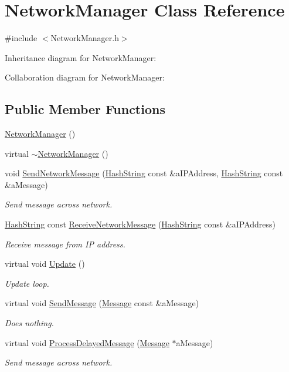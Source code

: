 \hypertarget{classNetworkManager}{}\section{Network\+Manager Class Reference}
\label{classNetworkManager}


{\ttfamily \#include $<$Network\+Manager.\+h$>$}



Inheritance diagram for Network\+Manager\+:


Collaboration diagram for Network\+Manager\+:
\subsection*{Public Member Functions}
\begin{DoxyCompactItemize}
\item 
\hyperlink{classNetworkManager_a5aaf71c4aa7a2efab7f1dbae02312280}{Network\+Manager} ()
\item 
virtual \hyperlink{classNetworkManager_a2cfe4223139cf58587a9f066b956cb23}{$\sim$\+Network\+Manager} ()
\item 
void \hyperlink{classNetworkManager_a025ee7c6f48d637ad8f7da5cc1214747}{Send\+Network\+Message} (\hyperlink{classHashString}{Hash\+String} const \&a\+I\+P\+Address, \hyperlink{classHashString}{Hash\+String} const \&a\+Message)
\begin{DoxyCompactList}\small\item\em Send message across network. \end{DoxyCompactList}\item 
\hyperlink{classHashString}{Hash\+String} const \hyperlink{classNetworkManager_ab30223e649c6c704eac910c3880d3931}{Receive\+Network\+Message} (\hyperlink{classHashString}{Hash\+String} const \&a\+I\+P\+Address)
\begin{DoxyCompactList}\small\item\em Receive message from IP address. \end{DoxyCompactList}\item 
virtual void \hyperlink{classNetworkManager_ad71efb4104426ea7201edaff52ba9a00}{Update} ()
\begin{DoxyCompactList}\small\item\em Update loop. \end{DoxyCompactList}\item 
virtual void \hyperlink{classNetworkManager_a5877be08a550014e491d6993d1fc137e}{Send\+Message} (\hyperlink{classMessage}{Message} const \&a\+Message)
\begin{DoxyCompactList}\small\item\em Does nothing. \end{DoxyCompactList}\item 
virtual void \hyperlink{classNetworkManager_a3bfc52f52ebcec23eacf456660f1e9a6}{Process\+Delayed\+Message} (\hyperlink{classMessage}{Message} $\ast$a\+Message)
\begin{DoxyCompactList}\small\item\em Send message across network. \end{DoxyCompactList}\end{DoxyCompactItemize}
